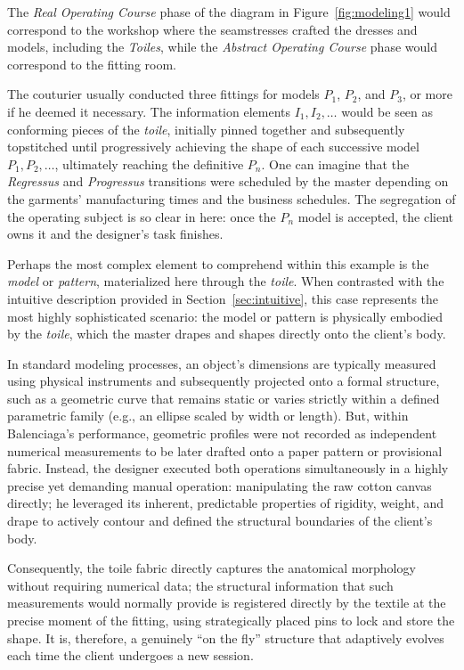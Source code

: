 \documentclass[11pt, a4paper]{article}
\begin{document}
The \textit{Real Operating Course} phase of the diagram in Figure~\ref{fig:modeling1} would correspond to the workshop where the seamstresses crafted the dresses and models, including the \textit{Toiles}, while the \textit{Abstract Operating Course} phase would correspond to the fitting room.

The couturier usually conducted three fittings for models $P_1$, $P_2$, and $P_3$, or more if he deemed it necessary. The information elements $I_1, I_2, \ldots$ would be seen as conforming pieces of the \textit{toile}, initially pinned together and subsequently topstitched until progressively achieving the shape of each successive model $P_1, P_2, \ldots$, ultimately reaching the definitive $P_n$. One can imagine that the \textit{Regressus} and \textit{Progressus} transitions were scheduled by the master depending on the garments' manufacturing times and the business schedules.
The segregation of the operating subject is so clear in here: once the $P_{n}$ model is accepted, the client owns it and the designer's task finishes.


Perhaps the most complex element to comprehend within this example is the \textit{model} or \textit{pattern}, materialized here through the \textit{toile}. When contrasted with the intuitive description provided in Section~\ref{sec:intuitive}, this case represents the most highly sophisticated scenario: the model or pattern is physically embodied by the \textit{toile}, which the master drapes and shapes directly onto the client's body.

In standard modeling processes, an object's dimensions are typically measured using physical instruments and subsequently projected onto a formal structure, such as a geometric curve that remains static or varies strictly within a defined parametric family (e.g., an ellipse scaled by width or length). But, within Balenciaga's performance, geometric profiles were not recorded as independent numerical measurements to be later drafted onto a paper pattern or provisional fabric. Instead, the designer executed both operations simultaneously in a highly precise yet demanding manual operation: manipulating the raw cotton canvas directly; he leveraged its inherent, predictable properties of rigidity, weight, and drape to actively contour and defined the structural boundaries of the client's body.

Consequently, the toile fabric directly captures the anatomical morphology without requiring numerical data; the structural information that such measurements would normally provide is registered directly by the textile at the precise moment of the fitting, using strategically placed pins to lock and store the shape. It is, therefore, a genuinely ``on the fly'' structure that adaptively evolves each time the client undergoes a new session.
\end{document}
